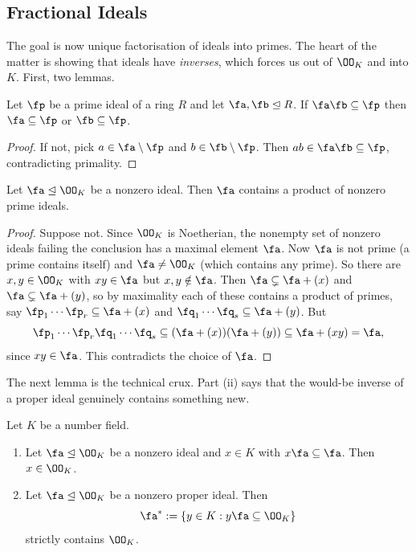 \subsection{Fractional Ideals}

The goal is now unique factorisation of ideals into primes. The heart of the matter is showing that ideals have \emph{inverses}, which forces us out of $\OO_K$ and into $K$. First, two lemmas.

\begin{lemma}\label{lem:primecontain}
	Let $\fp$ be a prime ideal of a ring $R$ and let $\fa, \fb \trianglelefteq R$. If $\fa\fb \subseteq \fp$ then $\fa \subseteq \fp$ or $\fb \subseteq \fp$.
\end{lemma}

\begin{proof}
	If not, pick $a \in \fa\setminus\fp$ and $b \in \fb\setminus\fp$. Then $ab \in \fa\fb \subseteq \fp$, contradicting primality.
\end{proof}

\begin{lemma}\label{lem:containsprod}
	Let $\fa \trianglelefteq \OO_K$ be a nonzero ideal. Then $\fa$ contains a product of nonzero prime ideals.
\end{lemma}

\begin{proof}
	Suppose not. Since $\OO_K$ is Noetherian, the nonempty set of nonzero ideals failing the conclusion has a maximal element $\fa$. Now $\fa$ is not prime (a prime contains itself) and $\fa \neq \OO_K$ (which contains any prime). So there are $x, y \in \OO_K$ with $xy \in \fa$ but $x, y \notin \fa$. Then $\fa \subsetneq \fa + (x)$ and $\fa \subsetneq \fa + (y)$, so by maximality each of these contains a product of primes, say $\fp_1\cdots\fp_r \subseteq \fa + (x)$ and $\fq_1\cdots\fq_s \subseteq \fa+(y)$. But
	$$\fp_1\cdots\fp_r\fq_1\cdots\fq_s \subseteq (\fa+(x))(\fa+(y)) \subseteq \fa + (xy) = \fa,$$
	since $xy \in \fa$. This contradicts the choice of $\fa$.
\end{proof}

The next lemma is the technical crux. Part (ii) says that the would-be inverse of a proper ideal genuinely contains something new.

\begin{lemma}\label{lem:crux}
	Let $K$ be a number field.
	\begin{enumerate}[label=(\roman*)]
		\item Let $\fa \trianglelefteq \OO_K$ be a nonzero ideal and $x \in K$ with $x\fa \subseteq \fa$. Then $x \in \OO_K$.
		\item Let $\fa \trianglelefteq \OO_K$ be a nonzero proper ideal. Then
		$$\fa^* := \{y \in K : y\fa \subseteq \OO_K\}$$
		strictly contains $\OO_K$.
	\end{enumerate}
\end{lemma}

